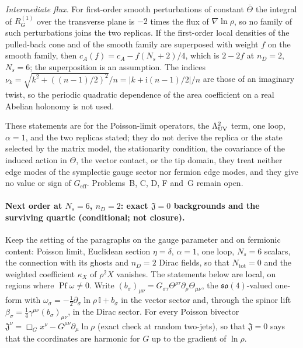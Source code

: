 \emph{Intermediate flux.} For first-order smooth perturbations of constant \(\bar\Theta\) the integral of \(R_G^{(1)}\) over the transverse plane is \(-2\) times the flux of \(\nabla\ln\rho\), so no family of such perturbations joins the two replicas. If the first-order local densities of the pulled-back cone and of the smooth family are superposed with weight \(f\) on the smooth family, then \(c_A(f)=c_A-f(N_s+2)/4\), which is \(2-2f\) at \(n_D=2\), \(N_s=6\); the superposition is an assumption. The indices \(\nu_k=\sqrt{k^2+((n-1)/2)^2}/n=|k+\mathrm i(n-1)/2|/n\) are those of an imaginary twist, so the periodic quadratic dependence of the area coefficient on a real Abelian holonomy is not used.

These statements are for the Poisson-limit operators, the \(\Lambda_{\mathrm{UV}}^2\) term, one loop, \(\alpha=1\), and the two replicas stated; they do not derive the replica or the state selected by the matrix model, the stationarity condition, the covariance of the induced action in \(\Theta\), the vector contact, or the tip domain, they treat neither edge modes of the symplectic gauge sector nor fermion edge modes, and they give no value or sign of \(G_{\mathrm{eff}}\). Problems~B, C, D, F and~G remain open.

\paragraph{Next order at \(N_s=6\), \(n_D=2\): exact \(\mathfrak J=0\) backgrounds and the surviving quartic (conditional; not closure).}
Keep the setting of the paragraphs on the gauge parameter and on fermionic content: Poisson limit, Euclidean section \(\eta=\delta\), \(\alpha=1\), one loop, \(N_s=6\) scalars, the connection with its ghosts and \(n_D=2\) Dirac fields, so that \(N_{\mathrm{tot}}=0\) and the weighted coefficient \(\kappa_X\) of \(\rho^2X\) vanishes. The statements below are local, on regions where \(\operatorname{Pf}\omega\ne0\). Write \((b_\sigma)_{\mu\nu}=G_{\sigma\tau}\Theta^{\rho\tau}\partial_\rho\Theta_{\mu\nu}\), the \(\mathfrak{so}(4)\)-valued one-form with \(\omega_\sigma=-\tfrac12\partial_\sigma\ln\rho\,\mathbb I+b_\sigma\) in the vector sector and, through the spinor lift \(\beta_\sigma=\tfrac14\gamma^{\mu\nu}(b_\sigma)_{\mu\nu}\), in the Dirac sector. For every Poisson bivector \(\mathfrak J^\nu=\Box_Gx^\nu-G^{\mu\nu}\partial_\mu\ln\rho\) (exact check at random two-jets), so that \(\mathfrak J=0\) says that the coordinates are harmonic for \(G\) up to the gradient of \(\ln\rho\).

